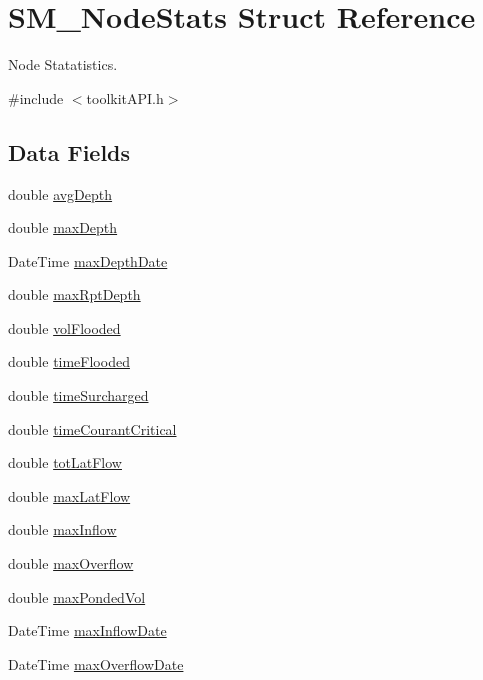 \hypertarget{struct_s_m___node_stats}{}\section{S\+M\+\_\+\+Node\+Stats Struct Reference}
\label{struct_s_m___node_stats}


Node Statatistics.  




{\ttfamily \#include $<$toolkit\+A\+P\+I.\+h$>$}

\subsection*{Data Fields}
\begin{DoxyCompactItemize}
\item 
double \hyperlink{struct_s_m___node_stats_a230b577dcfb5e235aa9e9a3248f6982b}{avg\+Depth}
\item 
double \hyperlink{struct_s_m___node_stats_a7228dabd4235761cf24edaa63c29ac5e}{max\+Depth}
\item 
Date\+Time \hyperlink{struct_s_m___node_stats_a06b896990c03d273d975875c2032240e}{max\+Depth\+Date}
\item 
double \hyperlink{struct_s_m___node_stats_af4943bebdf4257b46983ed86cd303da7}{max\+Rpt\+Depth}
\item 
double \hyperlink{struct_s_m___node_stats_adf413c73f0c6f3d2915edb21c3d358ab}{vol\+Flooded}
\item 
double \hyperlink{struct_s_m___node_stats_aa442cc713ba8fc1b8faa1d8d7ac6e39a}{time\+Flooded}
\item 
double \hyperlink{struct_s_m___node_stats_ae5c6e5a148cd0c7920e6298adccd4648}{time\+Surcharged}
\item 
double \hyperlink{struct_s_m___node_stats_a9b8dde5a8c0d75a55f9037adef91e309}{time\+Courant\+Critical}
\item 
double \hyperlink{struct_s_m___node_stats_add4807d2128a72b0de8c1fa096bde3aa}{tot\+Lat\+Flow}
\item 
double \hyperlink{struct_s_m___node_stats_aabfb73041d4fe6545121206fa34dd352}{max\+Lat\+Flow}
\item 
double \hyperlink{struct_s_m___node_stats_a5c837875883e9a27cf2d3e91857ad51c}{max\+Inflow}
\item 
double \hyperlink{struct_s_m___node_stats_a9b4fa95d090ed7b755f27735b58aa23f}{max\+Overflow}
\item 
double \hyperlink{struct_s_m___node_stats_ade826ebcbff96f86f19c2d395d563554}{max\+Ponded\+Vol}
\item 
Date\+Time \hyperlink{struct_s_m___node_stats_a764d21cd7dd2f17c7c7dca695c78a875}{max\+Inflow\+Date}
\item 
Date\+Time \hyperlink{struct_s_m___node_stats_a248c34db91b518161dbbe8c0346d72b4}{max\+Overflow\+Date}
\end{DoxyCompactItemize}


